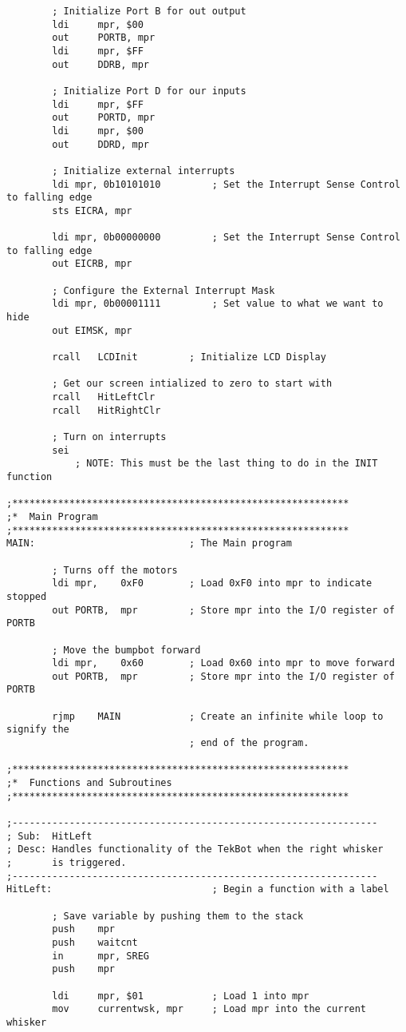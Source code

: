 \documentclass[12pt, letterpaper]{article}
\begin{document}
\begin{verbatim}
		; Initialize Port B for out output
		ldi		mpr, $00
		out		PORTB, mpr
		ldi		mpr, $FF
		out		DDRB, mpr

		; Initialize Port D for our inputs
		ldi		mpr, $FF
		out		PORTD, mpr
		ldi		mpr, $00
		out		DDRD, mpr

		; Initialize external interrupts
		ldi	mpr, 0b10101010			; Set the Interrupt Sense Control to falling edge 
		sts	EICRA, mpr
		
		ldi	mpr, 0b00000000			; Set the Interrupt Sense Control to falling edge 
		out	EICRB, mpr

		; Configure the External Interrupt Mask
		ldi	mpr, 0b00001111			; Set value to what we want to hide
		out	EIMSK, mpr

		rcall	LCDInit			; Initialize LCD Display

		; Get our screen intialized to zero to start with
		rcall	HitLeftClr
		rcall	HitRightClr

		; Turn on interrupts
		sei
			; NOTE: This must be the last thing to do in the INIT function

;***********************************************************
;*	Main Program
;***********************************************************
MAIN:							; The Main program

		; Turns off the motors 
		ldi	mpr,	0xF0		; Load 0xF0 into mpr to indicate stopped
		out	PORTB,	mpr			; Store mpr into the I/O register of PORTB

		; Move the bumpbot forward
		ldi	mpr,	0x60		; Load 0x60 into mpr to move forward
		out	PORTB,	mpr			; Store mpr into the I/O register of PORTB

		rjmp	MAIN			; Create an infinite while loop to signify the 
								; end of the program.

;***********************************************************
;*	Functions and Subroutines
;***********************************************************

;----------------------------------------------------------------
; Sub:	HitLeft
; Desc:	Handles functionality of the TekBot when the right whisker
;		is triggered.
;----------------------------------------------------------------
HitLeft:							; Begin a function with a label

		; Save variable by pushing them to the stack
		push	mpr
		push	waitcnt
		in  	mpr, SREG
		push	mpr

		ldi		mpr, $01			; Load 1 into mpr
		mov		currentwsk, mpr		; Load mpr into the current whisker


\end{verbatim}
\end{document}

